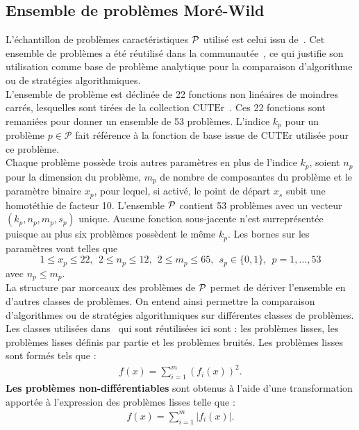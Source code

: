 	\subsection{Ensemble de problèmes Moré-Wild}
	L'échantillon de problèmes caractéristiques $\mathcal{P}$ utilisé est celui issu de~\cite{MoWi2009}. Cet ensemble de problèmes a été réutilisé dans la communautée~\cite{CoLed2011,VaVi07}, ce qui justifie son utilisation comme base de problème analytique pour la comparaison d'algorithme ou de stratégies algorithmiques.\\
	L'ensemble de problème est déclinée de 22 fonctions non linéaires de moindres carrés, lesquelles sont tirées de la collection $\mathrm{CUTEr}$~\cite{GoOrTo03}. Ces 22 fonctions sont remaniées pour donner un ensemble de 53 problèmes. L'indice $k_p$ pour un problème $p \in \mathcal{P}$ fait référence à la fonction de base issue de $\mathrm{CUTEr}$ utilisée pour ce problème.\\
	Chaque problème possède trois autres paramètres en plus de l'indice $k_p$, soient $n_p$ pour la dimension du problème, $m_p$ de nombre de composantes du problème et le paramètre binaire $x_p$, pour lequel, si activé, le point de départ $x_s$ subit une homotéthie de facteur 10. L'ensemble $\mathcal{P}$ contient 53 problèmes avec un vecteur $ (k_p,n_p,m_p,s_p) $ unique. Aucune fonction sous-jacente n'est surreprésentée puisque au plus six problèmes possèdent le même $k_p$. Les bornes sur les paramètres vont telles que 
	\begin{equation*}
	1 \leq x_p \leq 22,\ \ 2 \leq n_p \leq 12,\ \ 2\leq m_p\leq 65,\ \ s_p \in \{0,1\},\ \ p=1,\dots,53
	\end{equation*}
	avec $n_p \leq m_p$.\\
	La structure par morceaux des problèmes de $\mathcal{P}$ permet de dériver l'ensemble en d'autres classes de problèmes. On entend ainsi permettre la comparaison d'algorithmes ou de stratégies algorithmiques sur différentes classes de problèmes. Les classes utilisées dans~\cite{MoWi2009} qui sont réutilisées ici sont : les problèmes lisses, les problèmes lisses définis par partie et les problèmes bruités. Les problèmes lisses sont formés tels que : 
	\begin{gather*}
	f(x)=\sum_{i=1}^{m}{\left(f_i(x)\right)}^2.
	\end{gather*}
	\textbf{Les problèmes non-différentiables} sont obtenus à l'aide d'une transformation apportée à l'expression des problèmes lisses telle que : 
	\begin{gather*}
	f(x)=\sum_{i=1}^{m}{|f_i(x)|}.
	\end{gather*}
